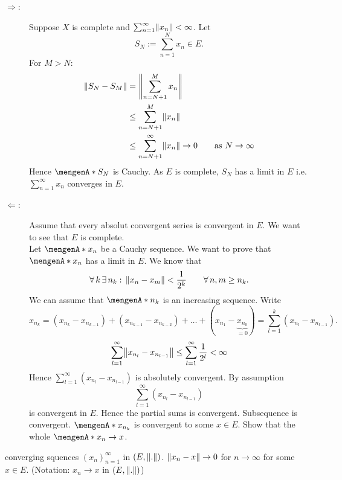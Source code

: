 \begin{beweis}
	\begin{description}
		\item[$\Rightarrow$:] Suppose $X$ is complete and $\sum_{n=1}^{\infty}\norm{x_n} < \infty$. Let 
		\[
			S_N := \sum_{n=1}^{N}x_n \in E.
		\] 
		For $M >N$:
		\begin{align*}
			\norm{S_N-S_M} &= \norm{\sum_{n=N+1}^{M}x_n} \\
			&\leq \sum_{n=N+1}^{M} \norm{x_n} \\
			&\leq \sum_{n=N+1}^{\infty} \norm{x_n} \to 0 \qquad \text{as }N \to \infty
		\end{align*}
		Hence $\set{S_N}$ is Cauchy. As $E$ is complete, $S_N$ has a limit in $E$ i.e. $\sum_{n=1}^{\infty}x_n$ converges in $E$.
		\item[$\Leftarrow$:] Assume that every absolut convergent series is convergent in $E$. We want to see that $E$ is complete. \\
		Let $\set{x_n}$ be a Cauchy sequence. We want to prove that $\set{x_n}$ has a limit in $E$. We know that
		\[
			\forall\, k \,\exists\,n_k: \, \norm{x_n-x_m}< \frac{1}{2^k} \qquad \forall\, n,m \geq n_k.
		\]
		We can assume that $\set{n_k}$ is an increasing sequence. Write
		\[
			x_{n_k} = (x_{n_k}-x_{n_{k-1}})+ (x_{n_{k-1}}-x_{n_{k-2}}) + \dots +(x_{n_1}-\underset{=0}{\underbrace{x_{n_0}}}) = \sum_{l=1}^{k}(x_{n_l}-x_{n_{l-1}}).
		\]
		\[
			\sum_{l=1}^{\infty}\norm{x_{n_l}-x_{n_{l-1}}} \leq \sum_{l=1}^{\infty}\frac{1}{2^l} < \infty
		\]
		Hence $\sum_{l=1}^{\infty}(x_{n_l}-x_{n_{l-1}})$ is absolutely convergent. By assumption 
		\[
			\sum_{l=1}^{\infty}(x_{n_l}-x_{n_{l-1}}) 
		\]
		is convergent in $E$. Hence the partial sums is convergent. Subsequence is convergent. $\set{x_{n_k}}$ is convergent to some $x \in E$.
		 Show that the whole $\set{x_n} \to x$.
	\end{description}
\end{beweis}
converging squences $(x_n)_{n=1}^{\infty}$ in $(E,\norm{.})$. $\norm{x_n-x} \to 0$ for $n \to \infty$ for some $x \in E$. (Notation: $x_n \to x$ in $(E,\norm{.})$)
